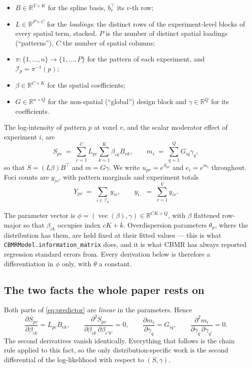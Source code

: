 \documentclass[11pt,a4paper]{article}
\theoremstyle{plain}
\theoremstyle{definition}
\newcommand{\R}{\mathbb{R}}
\newcommand{\E}{\mathcal{I}}
\newcommand{\vecop}{\operatorname{vec}}
\begin{document}
\begin{itemize}
  \item $B \in \R^{V \times K}$ for the spline basis, $b_v^\top$ its $v$-th row;
  \item $L \in \R^{P \times C}$ for the \emph{loadings}: the distinct rows of the experiment-level
        blocks of every spatial term, stacked. $P$ is the number of distinct spatial loadings
        (``patterns''), $C$ the number of spatial columns;
  \item $\pi : \{1,\dots,n\} \to \{1,\dots,P\}$ for the pattern of each experiment, and
        $\E_p = \pi^{-1}(p)$;
  \item $\beta \in \R^{C \times K}$ for the spatial coefficients;
  \item $G \in \R^{n \times Q}$ for the non-spatial (``global'') design block and
        $\gamma \in \R^{Q}$ for its coefficients.
\end{itemize}

The log-intensity of pattern $p$ at voxel $v$, and the scalar moderator effect of experiment
$i$, are
\begin{equation}\label{eq:predictor}
  S_{pv} \;=\; \sum_{c=1}^{C} L_{pc} \sum_{k=1}^{K} \beta_{ck} B_{vk},
  \qquad
  m_i \;=\; \sum_{q=1}^{Q} G_{iq}\gamma_q ,
\end{equation}
so that $S = (L\beta)B^\top$ and $m = G\gamma$. We write $u_{pv} = e^{S_{pv}}$ and
$e_i = e^{m_i}$ throughout. Foci counts are $y_{iv}$, with pattern marginals and experiment
totals
\begin{equation}
  Y_{pv} \;=\; \sum_{i \in \E_p} y_{iv},
  \qquad
  y_{i\cdot} \;=\; \sum_{v=1}^{V} y_{iv}.
\end{equation}

The parameter vector is $\phi = (\vecop(\beta), \gamma) \in \R^{CK + Q}$, with $\beta$ flattened
row-major so that $\beta_{ck}$ occupies index $cK + k$. Overdispersion parameters $\theta_p$,
where the distribution has them, are held fixed at their fitted values --- this is what
\texttt{CBMRModel.information\_matrix} does, and it is what CBMR has always reported regression
standard errors from. Every derivation below is therefore a differentiation in $\phi$ only,
with $\theta$ a constant.

\subsection{The two facts the whole paper rests on}

Both parts of \eqref{eq:predictor} are \emph{linear} in the parameters. Hence
\begin{equation}\label{eq:linear}
  \frac{\partial S_{pv}}{\partial \beta_{ck}} = L_{pc} B_{vk},
  \qquad
  \frac{\partial^2 S_{pv}}{\partial \beta_{ck}\,\partial \beta_{c'k'}} = 0,
  \qquad
  \frac{\partial m_i}{\partial \gamma_q} = G_{iq},
  \qquad
  \frac{\partial^2 m_i}{\partial \gamma_q\,\partial \gamma_{q'}} = 0 .
\end{equation}
The second derivatives vanish identically. Everything that follows is the chain rule applied to
this fact, so the only distribution-specific work is the second differential of the
log-likelihood with respect to $(S, \gamma)$.
\end{document}
